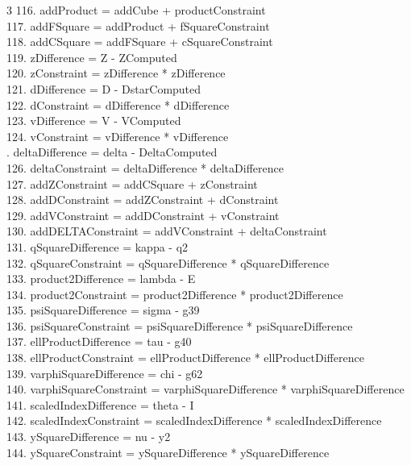 \documentclass[10pt]{article}
\begin{document}
\begin{multicols}{3}
116. addProduct = addCube + productConstraint\\
117. addFSquare = addProduct + fSquareConstraint\\
118. addCSquare = addFSquare + cSquareConstraint\\
119. zDifference = Z - ZComputed\\
120. zConstraint = zDifference * zDifference\\
121. dDifference = D - DstarComputed\\
122. dConstraint = dDifference * dDifference\\
123. vDifference = V - VComputed\\
124. vConstraint = vDifference * vDifference\\
. deltaDifference = delta - DeltaComputed\\
126. deltaConstraint = deltaDifference * deltaDifference\\
127. addZConstraint = addCSquare + zConstraint\\
128. addDConstraint = addZConstraint + dConstraint\\
129. addVConstraint = addDConstraint + vConstraint\\
130. addDELTAConstraint = addVConstraint + deltaConstraint\\
131. qSquareDifference = kappa - q2\\
132. qSquareConstraint = qSquareDifference * qSquareDifference\\
133. product2Difference = lambda - E\\
134. product2Constraint = product2Difference * product2Difference\\
135. psiSquareDifference = sigma - g39\\
136. psiSquareConstraint = psiSquareDifference * psiSquareDifference\\
137. ellProductDifference = tau - g40\\
138. ellProductConstraint = ellProductDifference * ellProductDifference\\
139. varphiSquareDifference = chi - g62\\
140. varphiSquareConstraint = varphiSquareDifference * varphiSquareDifference\\
141. scaledIndexDifference = theta - I\\
142. scaledIndexConstraint = scaledIndexDifference * scaledIndexDifference\\
143. ySquareDifference = nu - y2\\
144. ySquareConstraint = ySquareDifference * ySquareDifference\\

\end{multicols}
\end{document}
